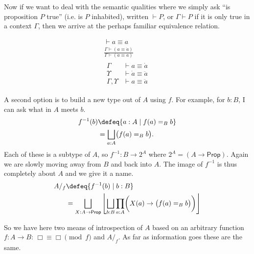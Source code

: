Now if we want to deal with the semantic qualities where we simply 
ask ``is proposition $P$ true'' (i.e. is $P$ inhabited), 
written $\vdash P$, or $\Gamma \vdash P$ if it is only true in a context $\Gamma$,
then we arrive at the perhaps familiar equivalence 
relation.

\begin{corollary}
    \begin{gather}
        \tag{Reflexive} 
        \vdash a\equiv a\\
        \tag{Symmetric}
        \frac{\Gamma \vdash (a\equiv \dot{a})}{\Gamma \vdash (\dot{a}\equiv a)}\\
        \tag{Transitive}
            \begin{array}{rl}
                \Gamma & \vdash a\equiv \dot{a}\\
                \Upsilon &\vdash \dot{a}\equiv \ddot{a}\\
                \hline 
                \Gamma,\Upsilon &\vdash a \equiv \ddot{a}
            \end{array}
    \end{gather}
\end{corollary}

A second option is to build a new type out of $A$ using $f$.
For example, for $b:B$, I can ask what in $A$ meets $b$.
\begin{align*}
    f^{-1}(b) &\defeq \{a:A\mid f(a)=_B b\} \\
    & =
    \bigsqcup_{a:A} \bigl(f(a)=_B b\bigr).
\end{align*}
Each of these is a subtype of $A$, so $f^{-1}:B\to 2^A$
where $2^A=(A\to \mathsf{Prop})$.  Again we are slowly 
moving away from $B$ and back into $A$.  The image of $f^{-1}$
is thus completely about $A$ and we give it a name.
\begin{align*}
    A/_f & \defeq \{ f^{-1}(b)\mid b:B\} \\
    & =
    \bigsqcup_{X:A\to \mathsf{Prop}}\left\lfloor 
        \bigsqcup_{b:B} \prod_{a:A}\biggl(X(a)\rightarrow \bigl(f(a)=_B b\bigr)\biggr)
    \right\rfloor
\end{align*}

So we have here two means of introspection of $A$ based 
on an arbitrary function $f:A\to B$: $\Box \equiv \Box\pmod{f}$
and $A/_f$.  As far as information goes these are the same.



